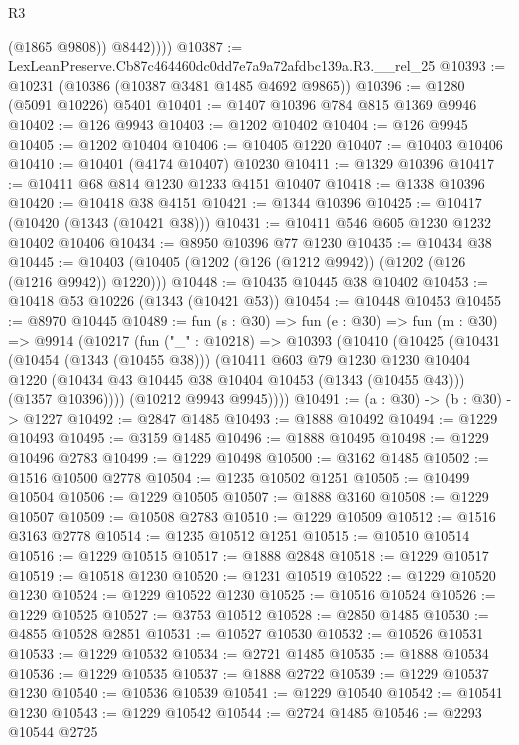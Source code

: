 \begin{lexlean}{R3}
\begin{coremodule}
              (@1865 @9808))
            @8442))))
@10387 := LexLeanPreserve.Cb87c464460dc0dd7e7a9a72afdbc139a.R3.__rel_25
@10393 := @10231 (@10386 (@10387 @3481 @1485 @4692 @9865))
@10396 := @1280 (@5091 @10226) @5401
@10401 := @1407 @10396 @784 @815 @1369 @9946
@10402 := @126 @9943
@10403 := @1202 @10402
@10404 := @126 @9945
@10405 := @1202 @10404
@10406 := @10405 @1220
@10407 := @10403 @10406
@10410 := @10401 (@4174 @10407) @10230
@10411 := @1329 @10396
@10417 := @10411 @68 @814 @1230 @1233 @4151 @10407
@10418 := @1338 @10396
@10420 := @10418 @38 @4151
@10421 := @1344 @10396
@10425 := @10417 (@10420 (@1343 (@10421 @38)))
@10431 := @10411 @546 @605 @1230 @1232 @10402 @10406
@10434 := @8950 @10396 @77 @1230
@10435 := @10434 @38
@10445 := @10403 (@10405 (@1202 (@126 (@1212 @9942)) (@1202 (@126 (@1216 @9942)) @1220)))
@10448 := @10435 @10445 @38 @10402
@10453 := @10418 @53 @10226 (@1343 (@10421 @53))
@10454 := @10448 @10453
@10455 := @8970 @10445
@10489 := fun (s : @30) =>
  fun (e : @30) =>
  fun (m : @30) =>
  @9914
    (@10217
      (fun ("_" : @10218) =>
      @10393
        (@10410
          (@10425
            (@10431
              (@10454 (@1343 (@10455 @38)))
              (@10411
                @603
                @79
                @1230
                @1230
                @10404
                @1220
                (@10434 @43 @10445 @38 @10404 @10453 (@1343 (@10455 @43)))
                (@1357 @10396))))
          (@10212 @9943 @9945))))
@10491 := (a : @30) -> (b : @30) -> @1227
@10492 := @2847 @1485
@10493 := @1888 @10492
@10494 := @1229 @10493
@10495 := @3159 @1485
@10496 := @1888 @10495
@10498 := @1229 @10496 @2783
@10499 := @1229 @10498
@10500 := @3162 @1485
@10502 := @1516 @10500 @2778
@10504 := @1235 @10502 @1251
@10505 := @10499 @10504
@10506 := @1229 @10505
@10507 := @1888 @3160
@10508 := @1229 @10507
@10509 := @10508 @2783
@10510 := @1229 @10509
@10512 := @1516 @3163 @2778
@10514 := @1235 @10512 @1251
@10515 := @10510 @10514
@10516 := @1229 @10515
@10517 := @1888 @2848
@10518 := @1229 @10517
@10519 := @10518 @1230
@10520 := @1231 @10519
@10522 := @1229 @10520 @1230
@10524 := @1229 @10522 @1230
@10525 := @10516 @10524
@10526 := @1229 @10525
@10527 := @3753 @10512
@10528 := @2850 @1485
@10530 := @4855 @10528 @2851
@10531 := @10527 @10530
@10532 := @10526 @10531
@10533 := @1229 @10532
@10534 := @2721 @1485
@10535 := @1888 @10534
@10536 := @1229 @10535
@10537 := @1888 @2722
@10539 := @1229 @10537 @1230
@10540 := @10536 @10539
@10541 := @1229 @10540
@10542 := @10541 @1230
@10543 := @1229 @10542
@10544 := @2724 @1485
@10546 := @2293 @10544 @2725

\end{coremodule}
\end{lexlean}

